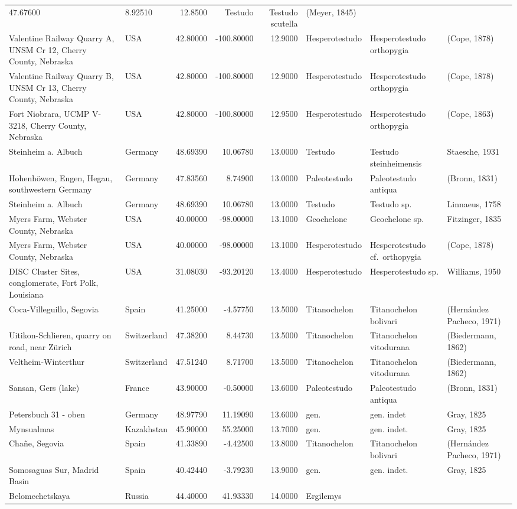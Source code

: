 \documentclass[]{article}
\begin{document}
\begin{longtable}[]{@{}llrrrlll@{}}
47.67600 & 8.92510 & 12.8500 & Testudo & Testudo scutella & (Meyer,
1845)\tabularnewline
Valentine Railway Quarry A, UNSM Cr 12, Cherry County, Nebraska & USA &
42.80000 & -100.80000 & 12.9000 & Hesperotestudo & Hesperotestudo
orthopygia & (Cope, 1878)\tabularnewline
Valentine Railway Quarry B, UNSM Cr 13, Cherry County, Nebraska & USA &
42.80000 & -100.80000 & 12.9000 & Hesperotestudo & Hesperotestudo
orthopygia & (Cope, 1878)\tabularnewline
Fort Niobrara, UCMP V-3218, Cherry County, Nebraska & USA & 42.80000 &
-100.80000 & 12.9500 & Hesperotestudo & Hesperotestudo orthopygia &
(Cope, 1863)\tabularnewline
Steinheim a. Albuch & Germany & 48.69390 & 10.06780 & 13.0000 & Testudo
& Testudo steinheimensis & Staesche, 1931\tabularnewline
Hohenhöwen, Engen, Hegau, southwestern Germany & Germany & 47.83560 &
8.74900 & 13.0000 & Paleotestudo & Paleotestudo antiqua & (Bronn,
1831)\tabularnewline
Steinheim a. Albuch & Germany & 48.69390 & 10.06780 & 13.0000 & Testudo
& Testudo sp. & Linnaeus, 1758\tabularnewline
Myers Farm, Webster County, Nebraska & USA & 40.00000 & -98.00000 &
13.1000 & Geochelone & Geochelone sp. & Fitzinger, 1835\tabularnewline
Myers Farm, Webster County, Nebraska & USA & 40.00000 & -98.00000 &
13.1000 & Hesperotestudo & Hesperotestudo cf.~orthopygia & (Cope,
1878)\tabularnewline
DISC Cluster Sites, conglomerate, Fort Polk, Louisiana & USA & 31.08030
& -93.20120 & 13.4000 & Hesperotestudo & Hesperotestudo sp. & Williams,
1950\tabularnewline
Coca-Villeguillo, Segovia & Spain & 41.25000 & -4.57750 & 13.5000 &
Titanochelon & Titanochelon bolivari & (Hernández Pacheco,
1971)\tabularnewline
Uitikon-Schlieren, quarry on road, near Zürich & Switzerland & 47.38200
& 8.44730 & 13.5000 & Titanochelon & Titanochelon vitodurana &
(Biedermann, 1862)\tabularnewline
Veltheim-Winterthur & Switzerland & 47.51240 & 8.71700 & 13.5000 &
Titanochelon & Titanochelon vitodurana & (Biedermann,
1862)\tabularnewline
Sansan, Gers (lake) & France & 43.90000 & -0.50000 & 13.6000 &
Paleotestudo & Paleotestudo antiqua & (Bronn, 1831)\tabularnewline
Petersbuch 31 - oben & Germany & 48.97790 & 11.19090 & 13.6000 & gen. &
gen. indet & Gray, 1825\tabularnewline
Mynsualmas & Kazakhstan & 45.90000 & 55.25000 & 13.7000 & gen. & gen.
indet. & Gray, 1825\tabularnewline
Chañe, Segovia & Spain & 41.33890 & -4.42500 & 13.8000 & Titanochelon &
Titanochelon bolivari & (Hernández Pacheco, 1971)\tabularnewline
Somosaguas Sur, Madrid Basin & Spain & 40.42440 & -3.79230 & 13.9000 &
gen. & gen. indet. & Gray, 1825\tabularnewline
Belomechetskaya & Russia & 44.40000 & 41.93330 & 14.0000 & Ergilemys &

\end{longtable}
\end{document}
